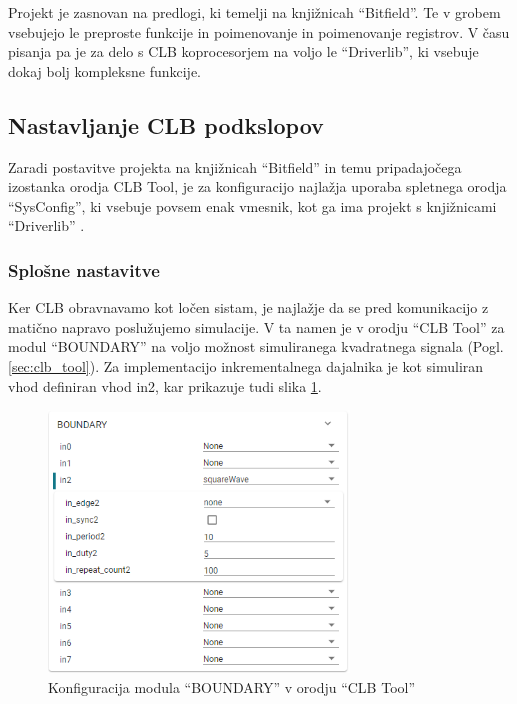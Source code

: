 \documentclass[a4paper]{article}
\begin{document}
\begin{sloppypar}
Projekt je zasnovan na predlogi, ki temelji na knjižnicah ``Bitfield''. Te v
grobem vsebujejo le preproste funkcije in poimenovanje in poimenovanje
registrov. V času pisanja pa je za delo s CLB koprocesorjem na voljo le
``Driverlib'', ki vsebuje dokaj bolj kompleksne funkcije.


\subsection{Nastavljanje CLB podkslopov}\label{sec:nastavitve_podsklopov}
Zaradi postavitve projekta na knjižnicah ``Bitfield'' in temu pripadajočega
izostanka orodja CLB Tool, je za konfiguracijo najlažja uporaba spletnega
orodja ``SysConfig'', ki vsebuje povsem enak vmesnik, kot ga ima projekt s
knjižnicami ``Driverlib'' \cite{sysconfig}.

\subsubsection{Splošne nastavitve}
Ker CLB obravnavamo kot ločen sistam, je najlažje da se pred komunikacijo z
matično napravo poslužujemo simulacije. V ta namen je v orodju ``CLB Tool'' za
modul ``BOUNDARY'' na voljo možnost simuliranega kvadratnega signala (Pogl.
\ref{sec:clb_tool}). Za implementacijo inkrementalnega dajalnika je kot
simuliran vhod definiran vhod in2, kar prikazuje tudi slika
\ref{fig:clbtool_boundary}.

\begin{figure}[htb]
    \centerline{\includegraphics[width=8cm]{clbtool_boundary}}
    \caption{Konfiguracija modula ``BOUNDARY'' v orodju ``CLB Tool''}
    \label{fig:clbtool_boundary} 
\end{figure} 


\end{sloppypar}
\end{document}
